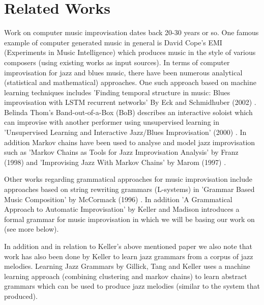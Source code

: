 \documentclass[pdftex,12pt,a4paper]{report}
\begin{document}
\section{Related Works}
Work on computer music improvisation dates back 20-30 years or so. One famous example of computer generated music in general is David Cope's EMI (Experiments in Music Intelligence) which produces music in the style of various composers (using existing works as input sources). In terms of computer improvisation for jazz and blues music, there have been numerous analytical (statistical and mathematical) approaches. One such approach based on machine learning techniques includes 'Finding temporal structure in music: Blues improvisation with LSTM recurrent networks' By Eck and Schmidhuber (2002) \cite{eck02}. Belinda Thom's Band-out-of-a-Box (BoB) describes an interactive soloist which can improvise with another performer using unsupervised learning in 'Unsupervised Learning and Interactive Jazz/Blues Improvisation' (2000) \cite{thom2000}. In addition Markov chains have been used to analyse and model jazz improvisation such as 'Markov Chains as Tools for Jazz Improvisation Analysis' by Franz (1998) \cite{franz98} and 'Improvising Jazz With Markov Chains' by Marom (1997) \cite{marom97}.

Other works regarding grammatical approaches for music improvisation include approaches based on string rewriting grammars (L-systems) in 'Grammar Based Music Composition' by McCormack (1996) \cite{mccormack96}. In addition 'A Grammatical Approach to Automatic Improvisation' by Keller and Madison \cite{keller07} introduces a formal grammar for music improvisation in which we will be basing our work on (see more below).

In addition and in relation to Keller's above mentioned paper \cite{keller07} we also note that work has also been done by Keller to learn jazz grammars from a corpus of jazz melodies. Learning Jazz Grammars by Gillick, Tang and Keller \cite{kellergillick09} uses a machine learning approach (combining clustering and markov chains) to learn abstract grammars which can be used to produce jazz melodies (similar to the system that \cite{keller07} produced). 
\end{document}
